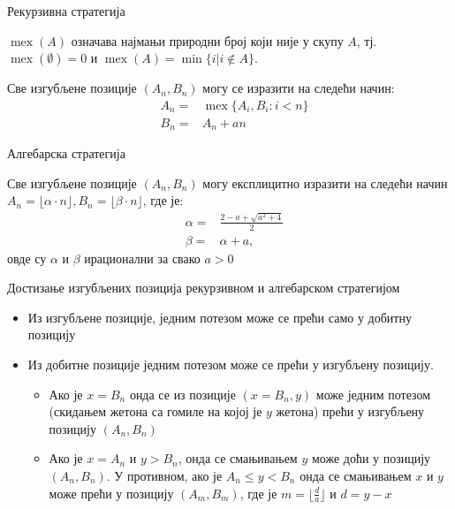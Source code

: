 \documentclass[10pt]{beamer}
\theoremstyle{remark}
\theoremstyle{definition}
\DeclareMathOperator{\mex}{mex}
\begin{document}
	\begin{frame}{Рекурзивна стратегија}
		\begin{tcolorbox}[title=Дефиниција оператора $ \mex $]
			$\mex(A)$ означава најмањи природни број који није у скупу $ A $, тј. $ \mex(\emptyset)=0 $ и
			$ \mex(A)=\min\{i | i\notin A\} $.
		\end{tcolorbox}
	
	    \begin{tcolorbox}[title=Рекурзивна карактеризација изгубљених позиција]
	    	Све изгубљене позиције $ (A_{n}, B_{n}) $ могу се изразити на следећи начин:
	    	\begin{eqnarray}
		    	&A_{n} = &\mex \{ A_{i}, B_{i} : i < n \}\\
		    	&B_{n} = &A_{n} + an
	    	\end{eqnarray}
	    \end{tcolorbox}
	\end{frame}

	\begin{frame}{Алгебарска стратегија}
		\begin{tcolorbox}[title=Алгебарска карактеризација изгубљених позиција]
			Све изгубљене позиције $ (A_{n}, B_{n}) $ могу експлицитно изразити на следећи начин $ A_{n} = \lfloor \alpha \cdot n \rfloor, B_{n} = \lfloor \beta \cdot n \rfloor $, где је:
			\begin{eqnarray}
				&\alpha = &\frac{2 - a + \sqrt{a^2 + 4}}{2} \label{def:alpha}\\  
				&\beta = &\alpha + a \label{def:beta},
			\end{eqnarray}
	    	овде су $ \alpha $ и $ \beta $ ирационални за свако $ a > 0 $
		\end{tcolorbox}
	\end{frame}
	
	\begin{frame}{Достизање изгубљених позиција рекурзивном и алгебарском стратегијом}
		\begin{itemize}
			\item Из изгубљене позиције, једним потезом може се прећи само у добитну позицију
			\item Из добитне позиције једним потезом може се прећи у изгубљену позицију.
			\begin{itemize}
				\item Ако је $ x = B_{n} $ онда се из позиције $ (x = B_{n}, y) $ може једним потезом (скидањем жетона са гомиле на којој је $ y $ жетона) прећи у изгубљену позицију $ (A_{n}, B_{n}) $ 
				\item Ако је $ x = A_{n} $ и $ y > B_{n} $, онда се смањивањем $ y $ може доћи у позицију $ (A_{n}, B_{n}) $. У противном, ако је 
				$ A_{n} \leq y < B_{n} $ онда се смањивањем $ x $ и $ y $ може прећи у позицију $ (A_{m}, B_{m}) $, где је $ m = \lfloor \frac{d}{a} \rfloor $ и $ d = y - x $
			\end{itemize}
		\end{itemize}
	\end{frame}
	
\end{document}
